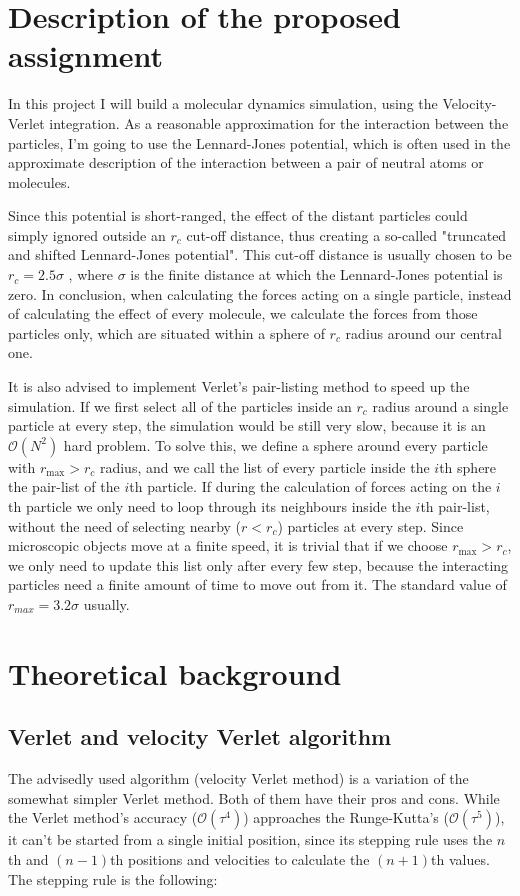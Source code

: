 \begin{multicols}{2}
\section{Description of the proposed assignment}
In this project I will build a molecular dynamics simulation, using the Velocity-Verlet integration. As a reasonable approximation for the interaction between the particles, I'm going to use the Lennard-Jones potential, which is often used in the approximate description of the interaction between a pair of neutral atoms or molecules. \par
Since this potential is short-ranged, the effect of the distant particles could simply ignored outside an $r_{c}$ cut-off distance, thus creating a so-called "truncated and shifted Lennard-Jones potential". This cut-off distance is usually chosen to be $r_{c} = 2.5 \sigma$ \citep{2011JChPh.134h1102T}, where $\sigma$ is the finite distance at which the Lennard-Jones potential is zero. In conclusion, when calculating the forces acting on a single particle, instead of calculating the effect of every molecule, we calculate the forces from those particles only, which are situated within a sphere of $r_{c}$ radius around our central one. \par
It is also advised to implement Verlet's pair-listing method to speed up the simulation. If we first select all of the particles inside an $r_{c}$ radius around a single particle at every step, the simulation would be still very slow, because it is an $\mathcal{O} \left( N^{2} \right)$ hard problem. To solve this, we define a sphere around every particle with $r_{\text{max}} > r_{c}$ radius, and we call the list of every particle inside the $i$th sphere the pair-list of the $i$th particle. If during the calculation of forces acting on the $i$th particle we only need to loop through its neighbours inside the $i$th pair-list, without the need of selecting nearby ($r < r_{c}$) particles at every step. Since microscopic objects move at a finite speed, it is trivial that if we choose $r_{\text{max}} > r_{c}$, we only need to update this list only after every few step, because the interacting particles need a finite amount of time to move out from it. The standard value of $r_{max} = 3.2 \sigma$ usually.

\section{Theoretical background}
\subsection{Verlet and velocity Verlet algorithm}
The advisedly used algorithm (velocity Verlet method) is a variation of the somewhat simpler Verlet method. Both of them have their pros and cons. While the Verlet method's accuracy ($\mathcal{O} \left( \tau^{4} \right)$) approaches the Runge-Kutta's ($\mathcal{O} \left( \tau^{5} \right)$), it can't be started from a single initial position, since its stepping rule uses the $n$th and $(n-1)$th positions and velocities to calculate the $(n+1)$th values. The stepping rule is the following:


\end{multicols}
